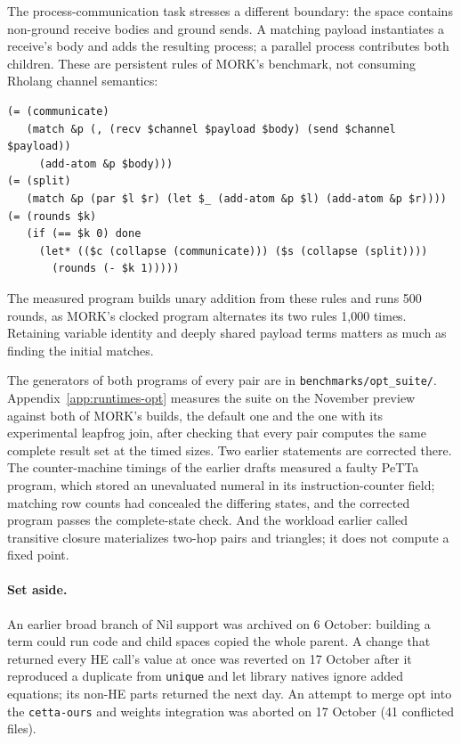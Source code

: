 \documentclass[11pt]{article}
\newcommand{\code}[1]{\texttt{#1}}
\newcommand{\PeTTa}{\textup{PeTTa}}
\newcommand{\HE}{\textup{HE}}
\begin{document}
The process-communication task stresses a different boundary: the space
contains non-ground receive bodies and ground sends.  A matching payload
instantiates a receive's body and adds the resulting process; a parallel
process contributes both children.  These are persistent rules of MORK's
benchmark, not consuming Rholang channel semantics:
\begin{lstlisting}[style=metta]
(= (communicate)
   (match &p (, (recv $channel $payload $body) (send $channel $payload))
     (add-atom &p $body)))
(= (split)
   (match &p (par $l $r) (let $_ (add-atom &p $l) (add-atom &p $r))))
(= (rounds $k)
   (if (== $k 0) done
     (let* (($c (collapse (communicate))) ($s (collapse (split))))
       (rounds (- $k 1)))))
\end{lstlisting}
The measured program builds unary addition from these rules and runs 500
rounds, as MORK's clocked program alternates its two rules 1,000 times.
Retaining variable identity and deeply shared payload terms matters as much
as finding the initial matches.

The generators of both programs of every pair are in
\code{benchmarks/opt\_suite/}.  Appendix~\ref{app:runtimes-opt} measures the
suite on the November preview against both of MORK's builds, the default one
and the one with its experimental leapfrog join, after checking that every
pair computes the same complete result set at the timed sizes.  Two earlier
statements are corrected there.  The counter-machine timings of the earlier
drafts measured a faulty \PeTTa{} program, which stored an unevaluated
numeral in its instruction-counter field; matching row counts had concealed
the differing states, and the corrected program passes the complete-state
check.  And the workload earlier called transitive closure materializes
two-hop pairs and triangles; it does not compute a fixed point.

\paragraph{Set aside.}  An earlier broad branch of Nil support was archived on
6 October: building a term could run code and child spaces copied the whole
parent.  A change that returned every \HE{} call's value at once was reverted
on 17 October after it reproduced a duplicate from \code{unique} and let
library natives ignore added equations; its non-\HE{} parts returned the next
day.  An attempt to merge opt into the \code{cetta-ours} and weights
integration was aborted on 17 October (41 conflicted files).
\end{document}
